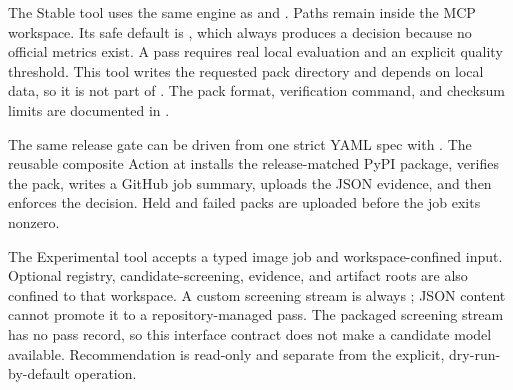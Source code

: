 The Stable  tool uses the same engine as
 and .
Paths remain inside the MCP workspace. Its safe default is
, which always produces a  decision because no
official metrics exist. A pass requires real local evaluation and an explicit
quality threshold. This tool writes the requested pack directory and depends
on local data, so it is not part of . The pack format,
verification command, and checksum limits are documented in
.

The same release gate can be driven from one strict YAML spec with
. The reusable composite
Action at  installs the
release-matched PyPI package, verifies the pack, writes a GitHub job summary,
uploads the JSON evidence, and then enforces the decision. Held and failed
packs are uploaded before the job exits nonzero.

The Experimental  tool accepts a typed image job
and workspace-confined input. Optional registry, candidate-screening, evidence,
and artifact roots are also confined to that workspace. A custom screening stream
is always ; JSON content cannot promote it to a
repository-managed pass. The packaged screening stream has no pass record, so this
interface contract does not make a candidate model available. Recommendation is
read-only and separate from the explicit, dry-run-by-default
 operation.

